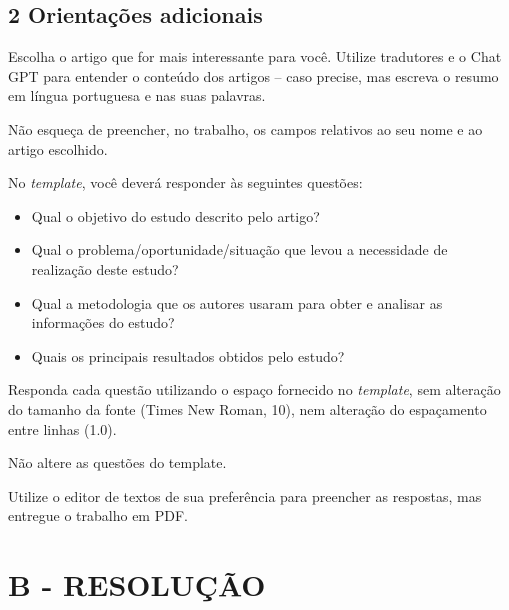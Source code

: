 \subsection*{\textbf{2 Orientações adicionais}}



Escolha o artigo que for mais interessante para você. Utilize tradutores e o Chat GPT para entender o conteúdo dos
artigos – caso precise, mas escreva o resumo em língua portuguesa e nas suas palavras. 



Não esqueça de preencher, no trabalho, os campos relativos ao seu nome e ao artigo escolhido.



No \textit{template}, você deverá responder às seguintes questões:

\begin{itemize}
\item Qual o objetivo do estudo descrito pelo artigo?
\item Qual o problema/oportunidade/situação que levou a necessidade de realização deste estudo?
\item Qual a metodologia que os autores usaram para obter e analisar as informações do estudo?
\item Quais os principais resultados obtidos pelo estudo?
\end{itemize}


Responda cada questão utilizando o espaço fornecido no \textit{template}, sem alteração do tamanho da fonte (Times New
Roman, 10), nem alteração do espaçamento entre linhas (1.0).



Não altere as questões do template.



Utilize o editor de textos de sua preferência para preencher as respostas, mas entregue o trabalho em PDF.


\section*{\textbf{B - RESOLUÇÃO}}
\lipsum[30]